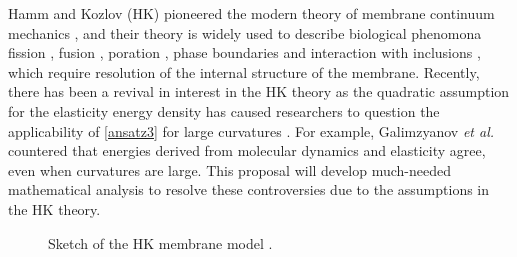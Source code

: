 Hamm and Kozlov (HK) pioneered 
the modern theory of membrane continuum mechanics \cite{Hamm2000}, and their theory
is widely used to describe biological phenomona 
fission \cite{FrEsAkSh15, Maetal15, PhysRevE.79.031926},
fusion \cite{ChKo08, KoKo2002,Kuzmin7235,Aeffner2012},
poration \cite{Gaetal20}, phase boundaries and interaction with inclusions
\cite{SeLeMaEg17,Saetal20, Pietal20}, which require resolution of the internal structure of the membrane.  
%
Recently, there has been a revival in interest in the HK theory as the quadratic assumption
for the elasticity energy density has caused researchers to question the applicability of \eqref{ansatz3} for large curvatures \cite{PhysRevLett.117.188102, ARGUDO20161619}. 
For example, Galimzyanov {\it et al.} \cite{C9SM02079A} countered that energies derived from molecular dynamics and elasticity agree, even when curvatures are large.
This proposal will develop much-needed mathematical analysis to resolve these controversies due to the assumptions in the HK theory. 

\begin{figure}
  \caption{\label{fig:deformations}Sketch of the HK membrane model \cite{Hamm2000}.
    }
\end{figure}

